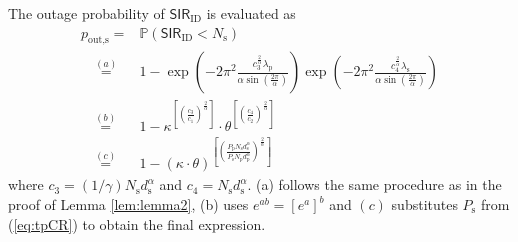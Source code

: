 \documentclass[conference, twocolumn]{IEEEtran}
\newcommand{\p}{\mathbb P}
\newcommand{\sub}[1]{_{\text{#1}}}
\begin{document}
\begin{IEEEproof}
The outage probability of $\mathsf{SIR}_{\text{ID}}$ is evaluated as
\begin{align}
p\sub{out,s} =& \p(\mathsf{SIR}_{\text{ID}} < N\sub{s}) \nonumber \\ 
\quad \overset{(a)}{=}& 1 - \exp \left( - 2\pi^2 \frac{c_3^{\frac{2}{\alpha}} \lambda\sub{p}}{\alpha \sin \left( \frac{2\pi}{\alpha} \right)} \right) \exp \left( - 2\pi^2 \frac{c_4^{\frac{2}{\alpha}} \lambda\sub{s}}{\alpha \sin \left( \frac{2\pi}{\alpha} \right)} \right) \nonumber \\   
\quad \overset{(b)}{=}& 1 - \kappa^{\left[ \left(  \frac{c_3}{c_1}\right)^{\frac{2}{\alpha}}\right] } \cdot \theta^{\left[ \left(  \frac{c_4}{c_2}\right)^{\frac{2}{\alpha}}\right] } \nonumber \\ 
\quad \overset{(c)}{=}& 1 - \left( \kappa \cdot \theta \right) ^{ \left[ \left(  \frac{P\sub{p} N\sub{s} d\sub{s}^{\alpha}}{P\sub{s} N\sub{p} d\sub{p}^{\alpha}} \right)^{\frac{2}{\alpha}} \right] } \nonumber 
\end{align}
where $c_3 = (1/\gamma) N\sub{s} d\sub{s}^{\alpha}$ and $c_4 = N\sub{s} d\sub{s}^{\alpha}$. (a) follows the same procedure as in the proof of Lemma \ref{lem:lemma2}, (b) uses $e^{ab} = \left[e^{a}\right]^{b}$ and $(c)$ substitutes $P\sub{s}$ from (\ref{eq:tpCR}) to obtain the final expression. 
\end{IEEEproof}
\end{document}
